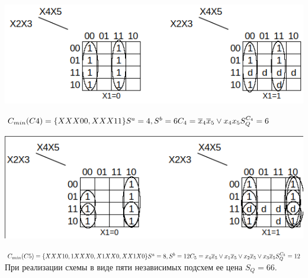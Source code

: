 \begin{center}
  \includegraphics[width=\linewidth]{imgs/part2/carno_C4.png}
\end{center}
$C_{min}(C4)=\{XXX00, XXX11\} \\
S^a=4, S^b=6 \\
C_4 = \overline{x}_{4}\overline{x}_{5}\vee x_{4}x_{5} \\
S^{C_4}_Q = 6
$

\begin{center}
  \includegraphics[width=\linewidth]{imgs/part2/carno_C5.png}
\end{center}
$C_{min}(C5)=\{XXX10, 1XXX0, X1XX0, XX1X0\} \\
S^a=8, S^b=12 \\
C_5 = x_{4}\overline{x}_{5}\vee x_{1}\overline{x}_{5}\vee x_{2}\overline{x}_{5}\vee x_{3}\overline{x}_{5} \\
S^{C_5}_Q = 12 \\
$
При реализации схемы в виде пяти независимых подсхем ее цена $S_Q=66$. \\